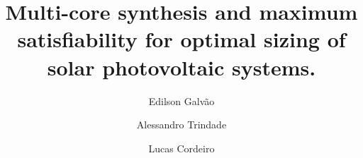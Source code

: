 \documentclass[a4paper,donotrepeattitle,fleqn]{cas-dc}
\begin{document}

\title [mode = title]{Multi-core synthesis and maximum satisfiability for optimal sizing of solar photovoltaic systems.}                      



\address[1]{Av. General Rodrigo Octavio, 1200 - Coroado I, Manaus - AM, Brazil}
\address[2]{Oxford Rd, Manchester M13 9PL, United Kingdom}

\author[1,1]{Edilson Galvão}
\author[2,1]{Alessandro Trindade}
\author[3,2]{Lucas Cordeiro}
   










\end{document}
